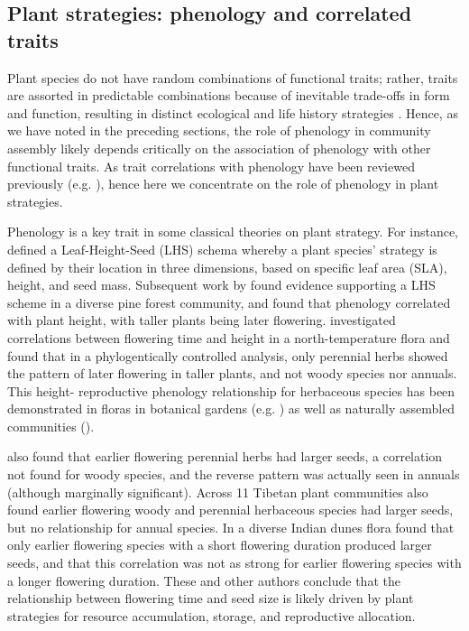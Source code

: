 \documentclass[11pt]{article}
\begin{document}
\subsection*{Plant strategies: phenology and correlated traits}

Plant species do not have random combinations of functional traits; rather, traits are assorted in predictable combinations because of inevitable trade-offs in form and function, resulting in distinct ecological and life history strategies \citep{stearns1998evolution,adler2014functional,westoby2002plant}. Hence, as we have noted in the preceding sections, the role of phenology in community assembly likely depends critically on the association of phenology with other functional traits. As trait correlations with phenology have been reviewed previously (e.g. \citet{wolkovich2014aob,segrestin2020reproductive}), hence here we concentrate on the role of phenology in plant strategies.

Phenology is a key trait in some classical theories on plant strategy. For instance, \citet{westoby1998leaf} defined a Leaf-Height-Seed (LHS) schema whereby a plant species’ strategy is defined by their location in three dimensions, based on specific leaf area (SLA), height, and seed mass. Subsequent work by \citet{laughlin2010multi} found evidence supporting a LHS scheme in a diverse pine forest community, and found that phenology correlated with plant height, with taller plants being later flowering. \citet{bolmgren2008time} investigated correlations between flowering time and height in a north-temperature flora and found that in a phylogentically controlled analysis, only perennial herbs showed the pattern of later flowering in taller plants, and not woody species nor annuals. This height- reproductive phenology relationship for herbaceous species has been demonstrated in floras in botanical gardens (e.g. \citet{sporbert2022functional, horbach2023flowering}) as well as naturally assembled communities (\citet{du2010trade, liu2021linkage}). 

\citet{bolmgren2008time} also found that earlier flowering perennial herbs had larger seeds, a correlation not found for woody species, and the reverse pattern was actually seen in annuals (although marginally significant). Across 11 Tibetan plant communities \citet{du2010trade} also found earlier flowering woody and perennial herbaceous species had larger seeds, but no relationship for annual species. In a diverse Indian dunes flora \citet{mazer1990seed} found that only earlier flowering species with a short flowering duration produced larger seeds, and that this correlation was not as strong for earlier flowering species with a longer flowering duration. These and other authors conclude that the relationship between flowering time and seed size is likely driven by plant strategies for resource accumulation, storage, and reproductive allocation.
\end{document}
